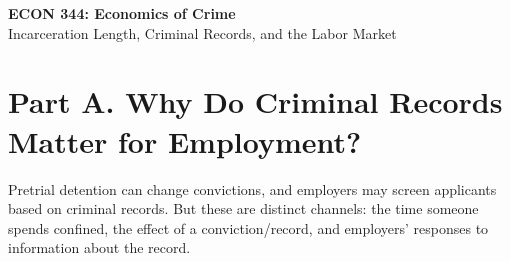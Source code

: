 \documentclass[11pt]{article}
\begin{document}
\begin{center}
{\large\bfseries ECON 344: Economics of Crime}\\[3pt]
Incarceration Length, Criminal Records, and the Labor Market
\end{center}


\medskip


\section*{Part A. Why Do Criminal Records Matter for Employment?}

Pretrial detention can change convictions, and employers may screen
applicants based on criminal records. But these are distinct channels:
the time someone spends confined, the effect of a conviction/record,
and employers' responses to information about the record.
\end{document}
